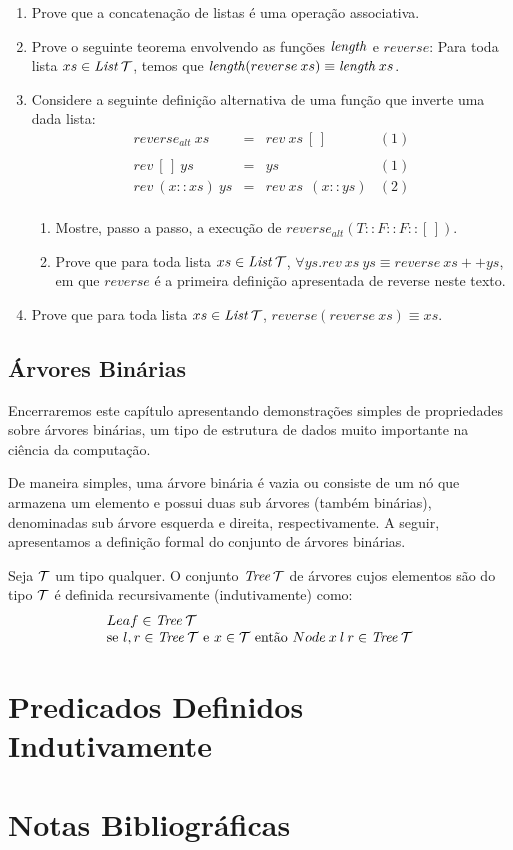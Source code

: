 \begin{enumerate}
  \item Prove que a concatenação de listas é uma operação associativa.
  \item Prove o seguinte teorema envolvendo as funções $\textit{length\/}$ e
    $reverse$: Para toda lista $xs \in \textit{List\/}\,\mathcal{T}$, temos que
    $\textit{length\/}(reverse \:xs)\equiv \textit{length\/}\:xs$.
 \item Considere a seguinte definição alternativa de uma função que
   inverte uma dada lista:
\[
\begin{array}{lclc}
  reverse_{alt}\:xs & = & rev\: xs \: [\,] & (1)\\
   & \\
  rev \: [\,] \: ys & = & ys & (1) \\
  rev \: (x :: xs) \: ys & = & rev \: xs \:\:(x :: ys) & (2)\\
\end{array}
\]
 \begin{enumerate}
   \item Mostre, passo a passo, a execução de $reverse_{alt}(T :: F ::
     F :: [\,])$.
   \item Prove que para toda lista $xs \in \textit{List\/}\,\mathcal{T}$,
     $\forall ys. rev\:xs\:ys \equiv reverse\: xs ++ ys$, em que $reverse$ é a
     primeira definição apresentada de reverse neste texto.
  \end{enumerate}
  \item Prove que para toda lista $xs\in\textit{List\/}\,\mathcal{T}$,
    $reverse(reverse\:xs) \equiv xs$.
\end{enumerate}

\subsection{Árvores Binárias}

Encerraremos este capítulo apresentando demonstrações simples de
propriedades sobre árvores binárias, um tipo de estrutura de dados
muito importante na ciência da computação.

De maneira simples, uma árvore binária é vazia ou consiste de um nó
que armazena um elemento e possui duas sub árvores (também binárias),
denominadas sub árvore esquerda e direita, respectivamente. A seguir,
apresentamos a definição formal do conjunto de árvores binárias.

\begin{Definition}
Seja $\mathcal{T}$ um tipo qualquer. O conjunto $\textit{Tree\/}\,\mathcal{T}$ de árvores
cujos elementos são do tipo $\mathcal{T}$ é definida recursivamente
(indutivamente) como:
\[
\begin{array}{l}
   Leaf \in \textit{Tree\/}\:\mathcal{T} \\
   \text{se }l,r \in \textit{Tree\/}\:\mathcal{T} \text{ e } x\in\mathcal{T} \text{ então } Node\:x\:l\:r\in\textit{Tree\/}\:\mathcal{T}
\end{array}
\]
\end{Definition}

\section{Predicados Definidos Indutivamente}

\section{Notas Bibliográficas}
